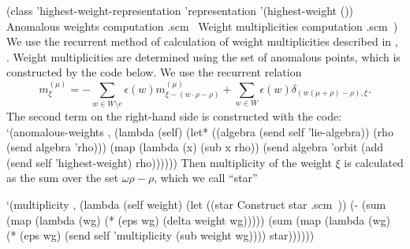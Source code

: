 \documentclass[a4paper,10pt]{article}
\theoremstyle{definition} \newtheorem{Def}{Definition}
\begin{document}
\nwenddocs{}\plusendmoddef
(class 'highest-weight-representation 'representation
       '(highest-weight ())
       \LA{}Anomalous weights computation .scm~{\nwtagstyle{}}\RA{}
       \LA{}Weight multiplicities computation .scm~{\nwtagstyle{}}\RA{})
\nwendcode{}\nwdocspar
We use the recurrent method of calculation of weight multiplicities described in \cite{lyakhovsky1996rra}, \cite{kulish4sfa}. Weight multiplicities are determined using the set of anomalous points, which is constructed by the code below.
We use the recurrent relation
\begin{equation}
  \label{eq:8}
  m_{\xi }^{\left( \mu \right) }=-\sum_{w\in W\setminus e}\epsilon (w)m_{\xi
-\left( w\cdot\rho-\rho \right) }^{\left( \mu \right) }+\sum_{w\in W}\epsilon
(w)\delta _{\left( w(\mu +\rho )-\rho \right) ,\xi }.  \label{gen-mult-form}
\end{equation}
The second term on the right-hand side is constructed with the code:
\nwenddocs{}\endmoddef
       `(anomalous-weights , 
         (lambda (self)
           (let* ((algebra (send self 'lie-algebra))
                  (rho (send algebra 'rho)))
             (map (lambda (x)
                    (sub x rho))
                  (send algebra 'orbit (add (send self 'highest-weight) rho))))))
\nwendcode{}\nwdocspar
Then multiplicity of the weight $\xi$ is calculated as the sum over the set $\omega\rho-\rho$, which we call ``star''

\nwenddocs{}\endmoddef
`(multiplicity , (lambda (self weight)
                   (let ((star \LA{}Construct star .scm~{\nwtagstyle{}}\RA{}))
                     (-
                      (sum (map (lambda (wg) (* (eps wg) (delta weight wg)))))
                      (sum (map (lambda (wg)
                                    (* (eps wg)
                                       (send self 'multiplicity (sub weight wg))))
                                  star))))))
  
\end{document}
